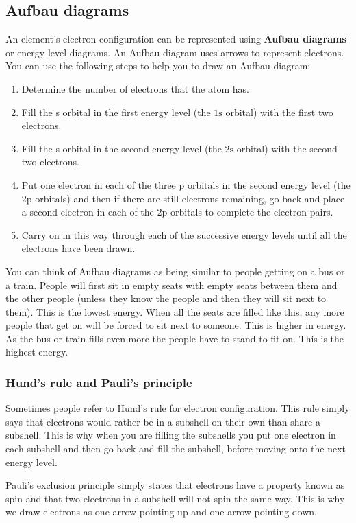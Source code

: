 \subsection*{Aufbau diagrams}        
\label{m38741*id259628}An element's electron configuration can be represented using \textbf{Aufbau diagrams} or energy level diagrams. An Aufbau diagram uses arrows to represent electrons. You can use the following steps to help you to draw an Aufbau diagram:
        \label{m38741*id259639}\begin{enumerate}[noitemsep, label=\textbf{\arabic*}. ] 
\item Determine the number of electrons that the atom has.
\item Fill the s orbital in the first energy level (the $1\text{s}$ orbital) with the first two electrons.
\item Fill the s orbital in the second energy level (the $2\text{s}$ orbital) with the second two electrons.
\item Put one electron in each of the three p orbitals in the second energy level (the $2\text{p}$ orbitals) and then if there are still electrons remaining, go back and place a second electron in each of the $2\text{p}$ orbitals to complete the electron pairs.
\item Carry on in this way through each of the successive energy levels until all the electrons have been drawn.
\end{enumerate}


\label{m38741*eip-873}You can think of Aufbau diagrams as being similar to people getting on a bus or a train. People will first sit in empty seats with empty seats between them and the other people (unless they know the people and then they will sit next to them). This is the lowest energy. When all the seats are filled like this, any more people that get on will be forced to sit next to someone. This is higher in energy. As the bus or train fills even more the people have to stand to fit on. This is the highest energy.  \label{m38741*id259728}
            \subsubsection*{Hund's rule and Pauli's principle}
            \nopagebreak
            \label{m38741*eip-188}
Sometimes people refer to Hund's rule for electron configuration. This rule simply says that electrons would rather be in a subshell on their own than share a subshell. This is why when you are filling the subshells you put one electron in each subshell and then go back and fill the subshell, before moving onto the next energy level.
\par 
\label{m38741*eip-id1167385514309}
Pauli's exclusion principle simply states that electrons have a property known as spin and that two electrons in a subshell will not spin the same way. This is why we draw electrons as one arrow pointing up and one arrow pointing down.
\par \label{m38741*uid104}
